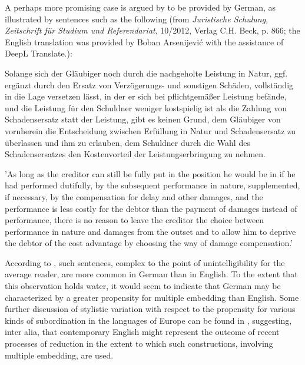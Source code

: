 \documentclass[output=paper,colorlinks,citecolor=brown
]{langscibook}
\begin{document}
A perhaps more promising case is argued by \citet{cysouw2023hierarchical} to be provided by German, as illustrated by sentences such as the following (from \emph{Juristische Schulung, Zeitschrift für Studium und Referendariat}, 10/2012, Verlag C.H. Beck, p. 866; the English translation was provided by Boban Arsenijević with the assistance of DeepL Translate.):

\ea

Solange sich der Gläubiger noch durch die nachgeholte Leistung in Natur, ggf. ergänzt durch den Ersatz von Verzögerungs- und sonstigen Schäden, vollständig in die Lage versetzen lässt, in der er sich bei pflichtgemäßer Leistung befände, und die Leistung für den Schuldner weniger kostspielig ist als die Zahlung von Schadensersatz statt der Leistung, gibt es keinen Grund, dem Gläubiger von vornherein die Entscheidung zwischen Erfüllung in Natur und Schadensersatz zu überlassen und ihm zu erlauben, dem Schuldner durch die Wahl des Schadensersatzes den Kostenvorteil der Leistungserbringung zu nehmen.

'As long as the creditor can still be fully put in the position he would be in if he had performed dutifully, by the subsequent performance in nature, supplemented, if necessary, by the compensation for delay and other damages, and the performance is less costly for the debtor than the payment of damages instead of performance, there is no reason to leave the creditor the choice between performance in nature and damages from the outset and to allow him to deprive the debtor of the cost advantage by choosing the way of damage compensation.'

\z

According to \citet{cysouw2023hierarchical}, such sentences, complex to the point of unintelligibility for the average reader, are more common in German than in English.  To the extent that this observation holds water, it would seem to indicate that German may be characterized by a greater propensity for multiple embedding than English.  Some further discussion of stylistic variation with respect to the propensity for various kinds of subordination in the languages of Europe can be found in \citet{karlsson2007aconstraints, karlsson2007bconstraints}, suggesting, inter alia, that contemporary English might represent the outcome of recent processes of reduction in the extent to which such constructions, involving multiple embedding, are used.
\end{document}
